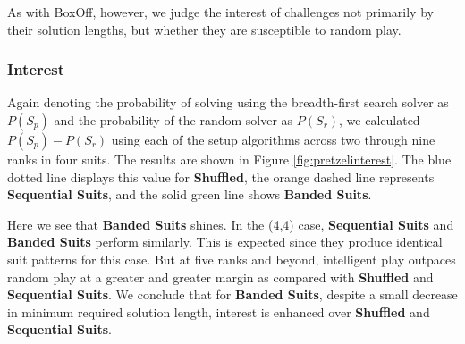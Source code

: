 \documentclass[journal]{IEEEtran}
\begin{document}
As with BoxOff, however, we judge the interest of challenges not primarily by their solution lengths, but whether they are susceptible to random play.






\subsubsection{Interest}

Again denoting the probability of solving using the breadth-first search solver as $P(S_p)$ and the probability of the random solver as $P(S_r)$, we calculated $P(S_p) - P(S_r)$ using each of the setup algorithms across two through nine ranks in four suits. The results are shown in Figure \ref{fig:pretzelinterest}. The blue dotted line displays this value for \textbf{Shuffled}, the orange dashed line represents \textbf{Sequential Suits}, and the solid green line shows \textbf{Banded Suits}.

Here we see that \textbf{Banded Suits} shines. In the (4,4) case, \textbf{Sequential Suits} and \textbf{Banded Suits} perform similarly. This is expected since they produce identical suit patterns for this case. But at five ranks and beyond, intelligent play outpaces random play at a greater and greater margin as compared with \textbf{Shuffled} and \textbf{Sequential Suits}. We conclude that for \textbf{Banded Suits}, despite a small decrease in minimum required solution length, interest is enhanced over \textbf{Shuffled} and \textbf{Sequential Suits}.
\end{document}
